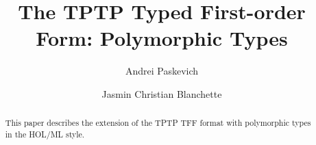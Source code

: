 \documentclass[draft,a4paper]{llncs}
\begin{document}
\title{
The TPTP Typed First-order Form: Polymorphic Types}

\author{
Andrei Paskevich \and Jasmin Christian Blanchette
}


\maketitle

\begin{abstract}
This paper describes the extension of the TPTP TFF format with polymorphic
types in the HOL/ML style.
\end{abstract}



%
%
\end{document}

